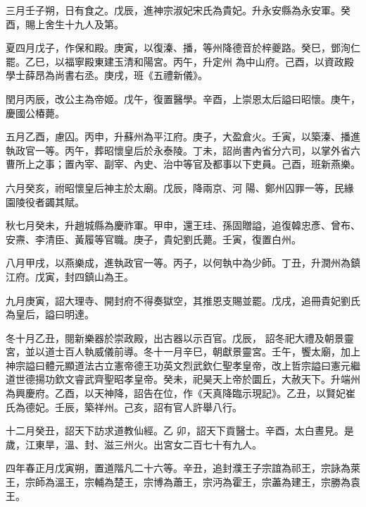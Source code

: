 \begin{pinyinscope}
 三月壬子朔，日有食之。戊辰，進神宗淑妃宋氏為貴妃。升永安縣為永安軍。癸酉，賜上舍生十九人及第。



 夏四月戊子，作保和殿。庚寅，以復溱、播，等州降德音於梓夔路。癸巳，鄧洵仁罷。乙巳，以福寧殿東建玉清和陽宮。丙午，升定州
 為中山府。己酉，以資政殿學士薛昂為尚書右丞。庚戌，班《五禮新儀》。



 閏月丙辰，改公主為帝姬。戊午，復置醫學。辛酉，上崇恩太后謚曰昭懷。庚午，慶國公椿薨。



 五月乙酉，慮囚。丙申，升蘇州為平江府。庚子，大盈倉火。壬寅，以築溱、播進執政官一等。丙午，葬昭懷皇后於永泰陵。丁未，詔尚書內省分六司，以掌外省六曹所上之事；置內宰、副宰、內史、治中等官及都事以下吏員。己酉，班新燕樂。



 六月癸亥，祔昭懷皇后神主於太廟。戊辰，降兩京、河
 陽、鄭州囚罪一等，民緣園陵役者蠲其賦。



 秋七月癸未，升趙城縣為慶祚軍。甲申，還王珪、孫固贈謚，追復韓忠彥、曾布、安燾、李清臣、黃履等官職。庚子，貴妃劉氏薨。壬寅，復置白州。



 八月甲戌，以燕樂成，進執政官一等。丙子，以何執中為少師。丁丑，升潤州為鎮江府。戊寅，封四鎮山為王。



 九月庚寅，詔大理寺、開封府不得奏獄空，其推恩支賜並罷。戊戌，追冊貴妃劉氏為皇后，謚曰明達。



 冬十月乙丑，閱新樂器於崇政殿，出古器以示百官。戊辰，
 詔冬祀大禮及朝景靈宮，並以道士百人執威儀前導。冬十一月辛巳，朝獻景靈宮。壬午，饗太廟，加上神宗謚曰體元顯道法古立憲帝德王功英文烈武欽仁聖孝皇帝，改上哲宗謚曰憲元繼道世德揚功欽文睿武齊聖昭孝皇帝。癸未，祀昊天上帝於圜丘，大赦天下。升端州為興慶府。乙酉，以天神降，詔告在位，作《天真降臨示現記》。乙丑，以賢妃崔氏為德妃。壬辰，築祥州。己亥，詔有官人許舉八行。



 十二月癸丑，詔天下訪求道教仙經。乙
 卯，詔天下貢醫士。辛酉，太白晝見。是歲，江東旱，溫、封、滋三州火。出宮女二百七十有九人。



 四年春正月戊寅朔，置道階凡二十六等。辛丑，追封濮王子宗誼為祁王，宗詠為萊王，宗師為溫王，宗輔為楚王，宗博為蕭王，宗沔為霍王，宗藎為建王，宗勝為袁王。




\end{pinyinscope}
